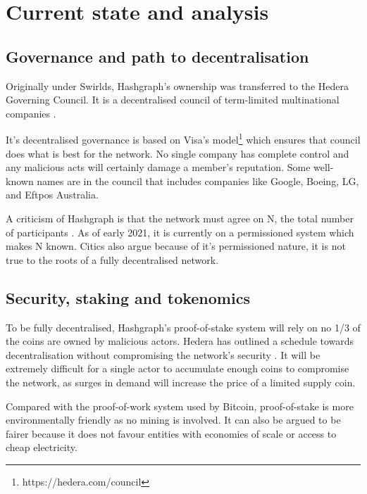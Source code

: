 \section{Current state and analysis}

\subsection{Governance and path to decentralisation}
Originally under Swirlds, Hashgraph's ownership was transferred to the Hedera Governing Council. It is a decentralised council of term-limited multinational companies \cite{baird2018hedera}. 

It's decentralised governance is based on Visa's model\footnote{https://hedera.com/council} which ensures that council does what is best for the network. No single company has complete control and any malicious acts will certainly damage a member's reputation. Some well-known names are in the council that includes companies like Google, Boeing, LG, and Eftpos Australia. 

A criticism of Hashgraph is that the network must agree on N, the total number of participants \cite{kauflin2018}. As of early 2021, it is currently on a permissioned system which makes N known. Citics also argue because of it's permissioned nature, it is not true to the roots of a fully decentralised network.


\subsection{Security, staking and tokenomics}
To be fully decentralised, Hashgraph's proof-of-stake system will rely on no 1/3 of the coins are owned by malicious actors. Hedera has outlined a schedule towards decentralisation without compromising the network's security \cite{economics2020hedera}. It will be extremely difficult for a single actor to accumulate enough coins to compromise the network, as surges in demand will increase the price of a limited supply coin.

Compared with the proof-of-work system used by Bitcoin, proof-of-stake is more environmentally friendly as no mining is involved. It can also be argued to be fairer because it does not favour entities with economies of scale or access to cheap electricity. 

